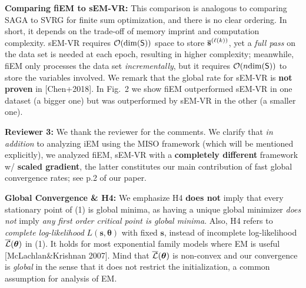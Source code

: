 \documentclass{article}
\begin{document}
\textbf{Comparing fiEM to sEM-VR:} This comparison is analogous to comparing SAGA to SVRG for finite sum optimization, and there is no clear ordering. In short, it depends on the trade-off of memory imprint and computation complexity. sEM-VR requires ${\cal O}({\rm dim}({\sf S}))$ space to store $\overline{\bf s}^{(\ell(k))}$, yet a \emph{full pass} on the data set is needed at each epoch, resulting in higher complexity; meanwhile,  fiEM only processes the data set \emph{incrementally}, but it requires ${\cal O}(n {\rm dim}({\sf S}))$ to store the variables involved.
We remark that the global rate for sEM-VR is \textbf{not proven} in [Chen+2018].
In Fig.~2 we show fiEM outperformed sEM-VR in one dataset (a bigger one) but was outperformed by sEM-VR in the other (a smaller one).






\textbf{\textcolor{green!50!black}{Reviewer 3:}} We thank the reviewer for the comments. We clarify that \emph{in addition} to analyzing iEM using the MISO framework (which will be mentioned explicitly), we analyzed fiEM, sEM-VR with a \textbf{completely different} framework w/ \textbf{scaled gradient}, the latter constitutes our main contribution of fast global convergence rates; see p.2 of our paper. 

\textbf{Global Convergence \& H4:} We emphasize H4 \textbf{does not} imply that every stationary point of (1) is global minima, as having a  unique global minimizer \emph{does not} imply \emph{any first order critical point is global minima}.
Also, H4 refers to \emph{complete log-likelihood} $L({\bm s}, \bm{\theta})$ with fixed ${\bm s}$, instead of incomplete log-likelihood $\overline{\cal L}(\bm{\theta})$ in (1). It holds for most exponential family models where  EM is useful [McLachlan\&Krishnan 2007]. Mind that $\overline{\cal L}(\bm{\theta})$ is  non-convex and our convergence is \emph{global} in the sense that it does not restrict the initialization, a common assumption for analysis of EM.
\end{document}
